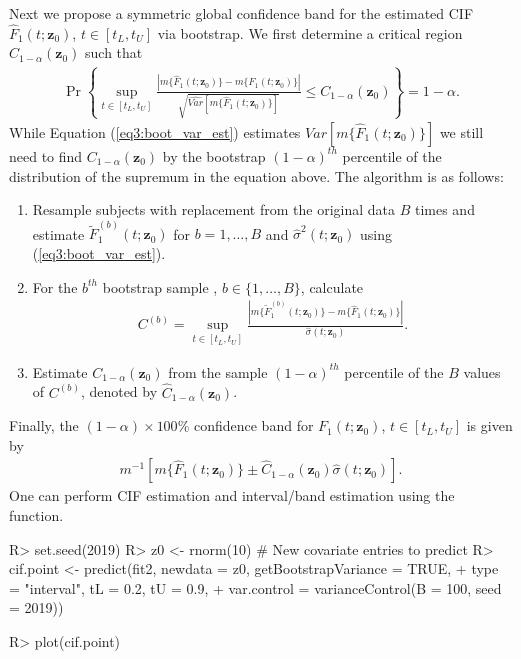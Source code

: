 Next we propose a symmetric global confidence band for the estimated CIF $\hat{F}_1(t; \mathbf{z}_0)$, $t \in [t_L, t_U]$ via bootstrap. We first determine a critical region $C_{1 - \alpha}(\mathbf{z}_0)$ such that 
\begin{align}
\Pr \left\{ \sup_{t \in [t_L, t_U]}  \frac{| m\{\hat{F}_1(t; \mathbf{z}_0)\} - m\{F_1(t; \mathbf{z}_0)\} |}{\sqrt{\widehat{Var}[m\{\hat{F}_1(t; \mathbf{z}_0)\}]}} \leq C_{1 - \alpha}(\mathbf{z}_0) \right\} = 1 - \alpha. 
\end{align}
While Equation (\ref{eq3:boot_var_est}) estimates $\widehat{Var}[m\{\hat{F}_1(t; \mathbf{z}_0)\}]$ we still need to find $C_{1 - \alpha}(\mathbf{z}_0)$ by the bootstrap $(1-\alpha)^{th}$ percentile of the distribution of the supremum in the equation above.  The algorithm is as follows:
\begin{enumerate}
\item Resample subjects with replacement from the original data $B$ times and estimate $\tilde{F}^{(b)}_1(t; \mathbf{z}_0)$ for $b = 1, \ldots, B$ and $\hat{\sigma}^2(t; \mathbf{z}_0)$ using (\ref{eq3:boot_var_est}).
\item For the $b^{th}$ bootstrap sample , $b \in \{1, \ldots, B\}$, calculate
\begin{align*}
C^{(b)} = \sup_{t \in [t_L, t_U]}  \frac{| m\{\tilde{F}^{(b)}_1(t; \mathbf{z}_0)\} - m\{\hat{F}_1(t; \mathbf{z}_0)\} |}{\hat{\sigma}(t; \mathbf{z}_0)}. 
\end{align*}
\item Estimate $C_{1 - \alpha}(\mathbf{z}_0)$ from the sample $(1 - \alpha)^{th}$ percentile of the $B$ values of $C^{(b)}$, denoted by $\hat{C}_{1 - \alpha}(\mathbf{z}_0)$.
\end{enumerate}

Finally, the $(1 - \alpha) \times 100\%$ confidence band for $F_{1}(t; \mathbf{z}_0)$, $t \in [t_L, t_U]$ is given by 
\begin{align}
\label{eq3:boot_cif_band}
m^{-1} \left[ m\{\hat{F}_1(t; \mathbf{z}_0)\} \pm \hat{C}_{1 - \alpha }(\mathbf{z}_0) \hat{\sigma}(t; \mathbf{z}_0)\right].
\end{align}
One can perform CIF estimation and interval/band estimation using the  function.

\begin{example}
R> set.seed(2019)
R> z0 <- rnorm(10) # New covariate entries to predict
R> cif.point <- predict(fit2, newdata = z0, getBootstrapVariance = TRUE,
+                      type = "interval", tL = 0.2, tU = 0.9,
+                      var.control = varianceControl(B = 100, seed = 2019))

R> plot(cif.point)                      
\end{example}

